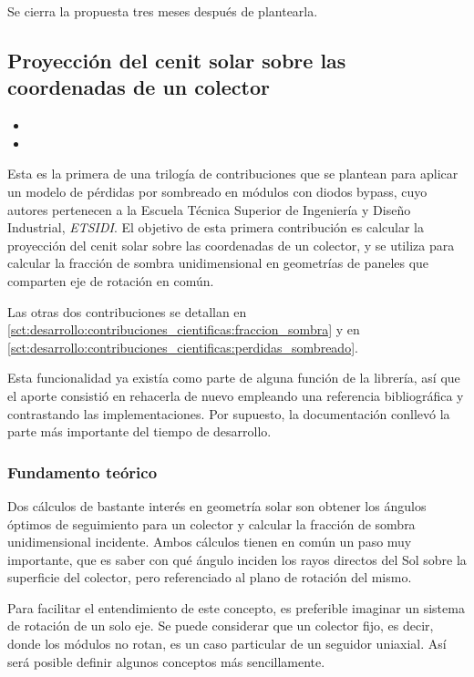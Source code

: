 Se cierra la propuesta tres meses después de plantearla.

\subsection{Proyección del cenit solar sobre las coordenadas de un colector} \label{sct:desarrollo:contribuciones_cientificas:proyeccion_cenit}

\begin{itemize}
    \item {}
    \item {}
\end{itemize}

Esta es la primera de una trilogía de contribuciones que se plantean para aplicar un modelo de pérdidas por sombreado en módulos con diodos bypass, cuyo autores pertenecen a la Escuela Técnica Superior de Ingeniería y Diseño Industrial, \textit{ETSIDI}. El objetivo de esta primera contribución es calcular la proyección del cenit solar sobre las coordenadas de un colector, y se utiliza para calcular la fracción de sombra unidimensional en geometrías de paneles que comparten eje de rotación en común.

Las otras dos contribuciones se detallan en \ref{sct:desarrollo:contribuciones_cientificas:fraccion_sombra} y en \ref{sct:desarrollo:contribuciones_cientificas:perdidas_sombreado}.

Esta funcionalidad ya existía como parte de alguna función de la librería, así que el aporte consistió en rehacerla de nuevo empleando una referencia bibliográfica y contrastando las implementaciones. Por supuesto, la documentación conllevó la parte más importante del tiempo de desarrollo.

\subsubsection{Fundamento teórico}

Dos cálculos de bastante interés en geometría solar son obtener los ángulos óptimos de seguimiento  para un colector y calcular la fracción de sombra unidimensional incidente. Ambos cálculos tienen en común un paso muy importante, que es saber con qué ángulo inciden los rayos directos del Sol sobre la superficie del colector, pero referenciado al plano de rotación del mismo.

Para facilitar el entendimiento de este concepto, es preferible imaginar un sistema de rotación de un solo eje. Se puede considerar que un colector fijo, es decir, donde los módulos no rotan, es un caso particular de un seguidor uniaxial. Así será posible definir algunos conceptos más sencillamente.


